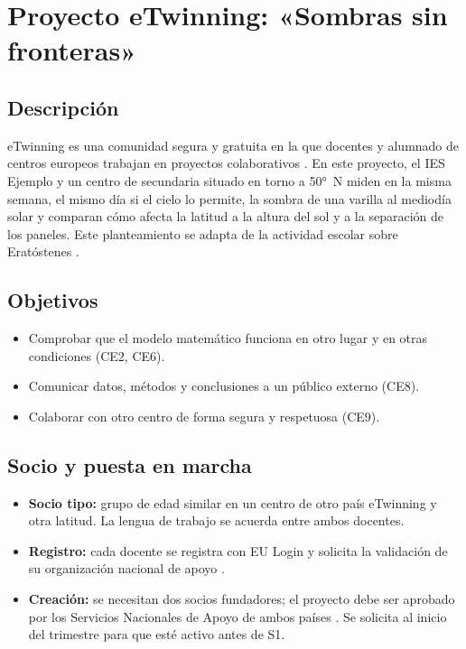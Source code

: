 \section{Proyecto eTwinning: «Sombras sin fronteras»}\label{sec:etwinning}

\subsection{Descripción}
eTwinning es una comunidad segura y gratuita en la que docentes y alumnado de centros europeos trabajan en proyectos colaborativos \parencite{esep}. En este proyecto, el IES Ejemplo y un centro de secundaria situado en torno a 50°~N miden en la misma semana, el mismo día si el cielo lo permite, la sombra de una varilla al mediodía solar y comparan cómo afecta la latitud a la altura del sol y a la separación de los paneles. Este planteamiento se adapta de la actividad escolar sobre Eratóstenes \parencite{eratostenes}.

\subsection{Objetivos}
\begin{itemize}
  \item Comprobar que el modelo matemático funciona en otro lugar y en otras condiciones (CE2, CE6).
  \item Comunicar datos, métodos y conclusiones a un público externo (CE8).
  \item Colaborar con otro centro de forma segura y respetuosa (CE9).
\end{itemize}

\subsection{Socio y puesta en marcha}
\begin{itemize}
  \item \textbf{Socio tipo:} grupo de edad similar en un centro de otro país eTwinning y otra latitud. La lengua de trabajo se acuerda entre ambos docentes.
  \item \textbf{Registro:} cada docente se registra con EU Login y solicita la validación de su organización nacional de apoyo \parencite{esep}.
  \item \textbf{Creación:} se necesitan dos socios fundadores; el proyecto debe ser aprobado por los Servicios Nacionales de Apoyo de ambos países \parencite{intef}. Se solicita al inicio del trimestre para que esté activo antes de S1.
\end{itemize}

